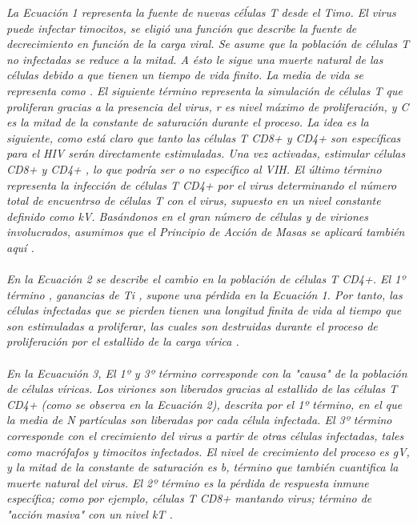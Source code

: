 \documentclass[a4paper,twocolumn,10pt]{article}
\begin{document}
{\itshape La Ecuación 1 representa la fuente de nuevas céĺulas T desde el Timo.  El virus puede infectar timocitos, se eligió una función que describe la fuente de decrecimiento en función de la carga viral. Se asume que la población de células T no infectadas se reduce a la mitad. A ésto le sigue una muerte natural de las células debido a que tienen un tiempo de vida finito. La media de vida se representa como \muT. El siguiente término representa la simulación de células T que proliferan gracias a la presencia del virus, r es nivel máximo de proliferación, y C es la mitad  de la constante de saturación durante el proceso. La idea es la siguiente, como está claro que tanto las células T CD8+ y CD4+ son específicas para el HIV serán directamente estimuladas. Una vez activadas, estimular células CD8+ y CD4+ , lo que podría ser o no específico al VIH. El último término representa la infección de células T CD4+ por el virus determinando el número total de encuentrso de células T con el virus, supuesto en un nivel constante definido como kV. 
Basándonos en el gran número de células y de viriones involucrados, asumimos que el Principio de Acción de Masas se aplicará también aquí \cite{Kirschner1996}.\\ \\
En la Ecuación 2 se describe el cambio en la población de células T CD4+. El 1º término , ganancias de Ti , supone una pérdida en la Ecuación 1. Por tanto, las células infectadas que se pierden tienen una longitud finita de vida al tiempo  que son estimuladas a proliferar, las cuales son destruidas durante el proceso de proliferación por el estallido de la carga vírica \cite{Kirschner1996}. \\ \\
En la Ecuacuión 3, El 1º y 3º término corresponde con la "causa" de la población de células víricas. Los viriones son liberados gracias al estallido de las células T CD4+ (como se observa en la Ecuación 2), descrita por el 1º término, en el que la media de N partículas son liberadas por cada célula infectada. El 3º término corresponde con el crecimiento del virus a partir de otras células infectadas, tales como macrófafos y timocitos infectados. El nivel de crecimiento del proceso es gV, y la mitad de la constante de saturación es b, término que también cuantifica la muerte natural del virus. El 2º término es la pérdida de respuesta inmune específica; como por ejemplo, células T CD8+ mantando virus; término de "acción masiva" con un nivel kT \cite{Kirschner1996}.}
\end{document}
